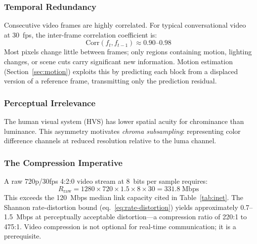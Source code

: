 \subsubsection{Temporal Redundancy}

Consecutive video frames are highly correlated. For typical conversational
video at 30~fps, the inter-frame correlation coefficient is:
\begin{equation}
  \text{Corr}(f_t, f_{t-1}) \approx 0.90\text{--}0.98
  \label{eq:temporal-corr}
\end{equation}
Most pixels change little between frames; only regions containing motion,
lighting changes, or scene cuts carry significant new information. Motion
estimation (Section~\ref{sec:motion}) exploits this by predicting each block
from a displaced version of a reference frame, transmitting only the
prediction residual.

\subsubsection{Perceptual Irrelevance}

The human visual system (HVS) has lower spatial acuity for chrominance than
luminance. This asymmetry motivates \emph{chroma subsampling}: representing
color difference channels at reduced resolution relative to the luma channel.


\subsubsection{The Compression Imperative}

A raw 720p/30fps 4:2:0 video stream at 8~bits per sample requires:
\begin{equation}
  R_{\text{raw}} = 1280 \times 720 \times 1.5 \times 8 \times 30
    = 331.8 \;\text{Mbps}
  \label{eq:raw-rate}
\end{equation}
This exceeds the 120~Mbps median link capacity cited in
Table~\ref{tab:inet}. The Shannon rate-distortion bound
(eq.~\ref{eq:rate-distortion}) yields approximately 0.7--1.5~Mbps at
perceptually acceptable distortion---a compression ratio of 220:1 to 475:1.
Video compression is not optional for real-time communication; it is a
prerequisite.

